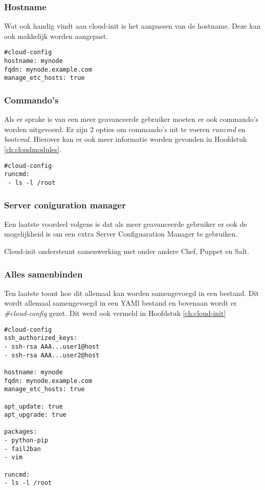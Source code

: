\subsubsection{Hostname}
Wat \autocite{viktorpet} ook handig vindt aan cloud-init is het aanpassen van de hostname. Deze kan ook makkelijk worden aangepast.
\begin{lstlisting}[basicstyle=\small]
#cloud-config
hostname: mynode
fqdn: mynode.example.com
manage_etc_hosts: true
\end{lstlisting} 

\subsubsection{Commando's}
Als er sprake is van een meer geavanceerde gebruiker moeten er ook commando's worden uitgevoerd. Er zijn 2 opties om commando's uit te voeren \textit{runcmd} en \textit{bootcmd}. Hierover kan er ook meer informatie worden gevonden in Hoofdstuk \ref*{ch:cloudmodules}.
\begin{lstlisting}[basicstyle=\small]
#cloud-config
runcmd:
 - ls -l /root
\end{lstlisting} 
\newpage
\subsubsection{Server coniguration manager}
Een laatste voordeel volgens \autocite{viktorpet} is dat als meer geavanceerde gebruiker er ook de mogelijkheid is om een extra Server Configuaration Manager te gebruiken. 

Cloud-init ondersteunt samenwerking met onder andere Chef, Puppet en Salt.
\subsubsection{Alles samenbinden}
Ten laatste toont \autocite{viktorpet} hoe dit allemaal kan worden samengevoegd in een bestand. Dit wordt allemaal samengevoegd in een YAMl bestand en bovenaan wordt er \textit{\#cloud-config} gezet. Dit werd ook vermeld in Hoofdstuk \ref*{ch:cloud-init}
\begin{lstlisting}[basicstyle=\small]
#cloud-config
ssh_authorized_keys:
- ssh-rsa AAA...user1@host
- ssh-rsa AAA...user2@host

hostname: mynode
fqdn: mynode.example.com
manage_etc_hosts: true

apt_update: true
apt_upgrade: true

packages:
- python-pip
- fail2ban
- vim

runcmd:
- ls -l /root
\end{lstlisting} 

